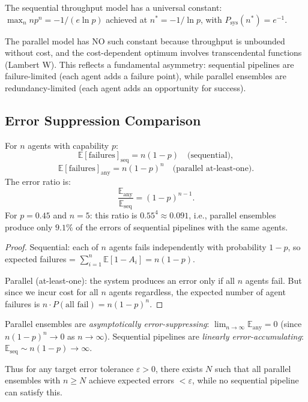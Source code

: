 \begin{remark}
The sequential throughput model has a universal constant: $\max_n n p^n = -1/(e \ln p)$ achieved
at $n^* = -1/\ln p$, with $P_{\mathrm{sys}}(n^*) = e^{-1}$.

The parallel model has NO such constant because throughput is unbounded without cost, and the
cost-dependent optimum involves transcendental functions (Lambert W). This reflects a fundamental
asymmetry: sequential pipelines are failure-limited (each agent adds a failure point), while
parallel ensembles are redundancy-limited (each agent adds an opportunity for success).
\end{remark}

\subsection{Error Suppression Comparison}

\begin{theorem}
\label{thm:parallel-error-suppression}
For $n$ agents with capability $p$:
\[
  \mathbb{E}[\text{failures}]_{\mathrm{seq}} = n(1-p) \quad\text{(sequential)},
\]
\[
  \mathbb{E}[\text{failures}]_{\mathrm{any}} = n(1-p)^n \quad\text{(parallel at-least-one)}.
\]
The error ratio is:
\[
  \frac{\mathbb{E}_{\mathrm{any}}}{\mathbb{E}_{\mathrm{seq}}} = (1-p)^{n-1}.
\]
For $p = 0.45$ and $n = 5$: this ratio is $0.55^4 \approx 0.091$, i.e., parallel ensembles produce
only $9.1\%$ of the errors of sequential pipelines with the same agents.
\end{theorem}

\begin{proof}
Sequential: each of $n$ agents fails independently with probability $1-p$, so expected failures = $\sum_{i=1}^n \mathbb{E}[1-A_i] = n(1-p)$.

Parallel (at-least-one): the system produces an error only if all $n$ agents fail. But since we incur cost for all $n$ agents regardless, the expected number of agent failures is $n \cdot P(\text{all fail}) = n(1-p)^n$.
\end{proof}

\begin{corollary}
Parallel ensembles are \emph{asymptotically error-suppressing}: $\lim_{n\to\infty} \mathbb{E}_{\mathrm{any}} = 0$
(since $n(1-p)^n \to 0$ as $n \to \infty$). Sequential pipelines are \emph{linearly error-accumulating}:
$\mathbb{E}_{\mathrm{seq}} \sim n(1-p) \to \infty$.

Thus for any target error tolerance $\varepsilon > 0$, there exists $N$ such that all parallel ensembles
with $n \ge N$ achieve expected errors $< \varepsilon$, while no sequential pipeline can satisfy this.
\end{corollary}

